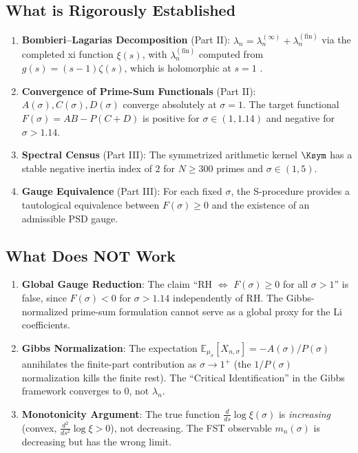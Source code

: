 \documentclass[12pt,a4paper]{article}
\begin{document}
\subsection{What is Rigorously Established}
\begin{enumerate}
    \item \textbf{Bombieri--Lagarias Decomposition} (Part II): $\lambda_n = \lambda_n^{(\infty)} + \lambda_n^{(\mathrm{fin})}$ via the completed xi function $\xi(s)$, with $\lambda_n^{(\mathrm{fin})}$ computed from $g(s) = (s-1)\zeta(s)$, which is holomorphic at $s=1$ \cite{BombieriLagarias1999}.
    \item \textbf{Convergence of Prime-Sum Functionals} (Part II): $A(\sigma), C(\sigma), D(\sigma)$ converge absolutely at $\sigma = 1$. The target functional $F(\sigma) = A B - P(C+D)$ is positive for $\sigma \in (1, 1.14)$ and negative for $\sigma > 1.14$.
    \item \textbf{Spectral Census} (Part III): The symmetrized arithmetic kernel $\Ksym$ has a stable negative inertia index of $2$ for $N \ge 300$ primes and $\sigma \in (1, 5)$.
    \item \textbf{Gauge Equivalence} (Part III): For each fixed $\sigma$, the S-procedure provides a tautological equivalence between $F(\sigma) \ge 0$ and the existence of an admissible PSD gauge.
\end{enumerate}

\subsection{What Does NOT Work}
\begin{enumerate}
    \item \textbf{Global Gauge Reduction}: The claim ``RH $\Leftrightarrow$ $F(\sigma) \ge 0$ for all $\sigma > 1$'' is false, since $F(\sigma) < 0$ for $\sigma > 1.14$ independently of RH. The Gibbs-normalized prime-sum formulation cannot serve as a global proxy for the Li coefficients.
    \item \textbf{Gibbs Normalization}: The expectation $\mathbb{E}_{\mu_\sigma}[X_{n,\sigma}] = -A(\sigma)/P(\sigma)$ annihilates the finite-part contribution as $\sigma \to 1^+$ (the $1/P(\sigma)$ normalization kills the finite rest). The ``Critical Identification'' in the Gibbs framework converges to $0$, not $\lambda_n$.
    \item \textbf{Monotonicity Argument}: The true function $\frac{d}{ds}\log\xi(\sigma)$ is \emph{increasing} (convex, $\frac{d^2}{ds^2}\log\xi > 0$), not decreasing. The FST observable $m_n(\sigma)$ is decreasing but has the wrong limit.
\end{enumerate}
\end{document}
